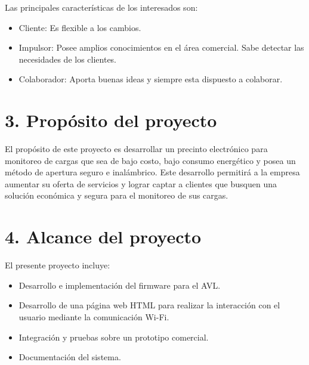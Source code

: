 \documentclass[
11pt, %
]{charter}
\begin{document}
%
%
%
% 
Las principales características de los interesados son:
\begin{itemize}
	\item Cliente: Es flexible a los cambios.
	\item Impulsor: Posee amplios conocimientos en el área comercial. Sabe detectar las necesidades de los clientes.
	\item Colaborador: Aporta buenas ideas y siempre esta dispuesto a colaborar.
\end{itemize}
%



\section{3. Propósito del proyecto}
\label{sec:proposito}

El propósito de este proyecto es desarrollar un precinto electrónico para monitoreo de cargas que sea de bajo costo, bajo consumo energético y posea un método de apertura seguro e inalámbrico. Este desarrollo permitirá a la empresa \empclientename \,aumentar su oferta de servicios y lograr captar a clientes que busquen una solución económica y segura para el monitoreo de sus cargas.  

%

\section{4. Alcance del proyecto}
\label{sec:alcance}
%
%
%
%
El presente proyecto incluye:
\begin{itemize}
\item Desarrollo e implementación del firmware para el AVL.
\item Desarrollo de una página web HTML para realizar la interacción con el usuario mediante la comunicación Wi-Fi.
\item Integración y pruebas sobre un prototipo comercial.
\item Documentación del sistema.
\end{itemize}
\end{document}
